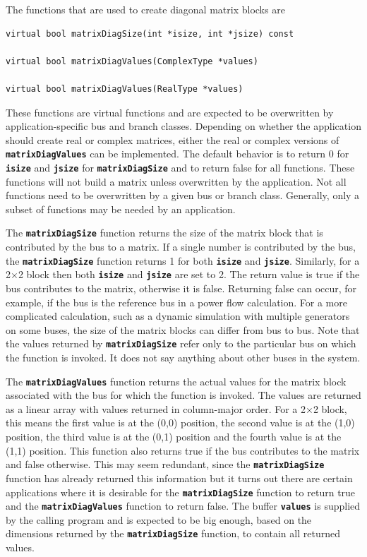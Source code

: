 The functions that are used to create diagonal matrix blocks are

{
\color{red}
\begin{Verbatim}[fontseries=b]
virtual bool matrixDiagSize(int *isize, int *jsize) const

virtual bool matrixDiagValues(ComplexType *values)

virtual bool matrixDiagValues(RealType *values)
\end{Verbatim}
}

These functions are virtual functions and are expected to be overwritten by application-specific bus and branch classes. Depending on whether the application should create real or complex matrices, either the real or complex versions of \texttt{\textbf{matrixDiagValues}} can be implemented. The default behavior is to return 0 for \texttt{\textbf{isize}} and \texttt{\textbf{jsize}} for \texttt{\textbf{matrixDiagSize}} and to return false for all functions. These functions will not build a matrix unless overwritten by the application. Not all functions need to be overwritten by a given bus or branch class. Generally, only a subset of functions may be needed by an application.

The \texttt{\textbf{matrixDiagSize}} function returns the size of the matrix block that is contributed by the bus to a matrix. If a single number is contributed by the bus, the \texttt{\textbf{matrixDiagSize}} function returns 1 for both \texttt{\textbf{isize}} and \texttt{\textbf{jsize}}. Similarly, for a 2$\mathrm{\times}$2 block then both \texttt{\textbf{isize}} and \texttt{\textbf{jsize}} are set to 2. The return value is true if the bus contributes to the matrix, otherwise it is false. Returning false can occur, for example, if the bus is the reference bus in a power flow calculation. For a more complicated calculation, such as a dynamic simulation with multiple generators on some buses, the size of the matrix blocks can differ from bus to bus. Note that the values returned by \texttt{\textbf{matrixDiagSize}} refer only to the particular bus on which the function is invoked. It does not say anything about other buses in the system.

The \texttt{\textbf{matrixDiagValues}} function returns the actual values for the matrix block associated with the bus for which the function is invoked. The values are returned as a linear array with values returned in column-major order. For a 2$\mathrm{\times}$2 block, this means the first value is at the (0,0) position, the second value is at the (1,0) position, the third value is at the (0,1) position and the fourth value is at the (1,1) position. This function also returns true if the bus contributes to the matrix and false otherwise. This may seem redundant, since the \texttt{\textbf{matrixDiagSize}} function has already returned this information but it turns out there are certain applications where it is desirable for the \texttt{\textbf{matrixDiagSize}} function to return true and the \texttt{\textbf{matrixDiagValues}} function to return false. The buffer \texttt{\textbf{values}} is supplied by the calling program and is expected to be big enough, based on the dimensions returned by the \texttt{\textbf{matrixDiagSize}} function, to contain all returned values.

